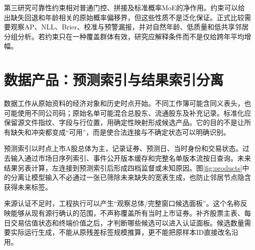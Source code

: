 第三研究可靠性约束相对普通门控、拼接及标准概率MoE的净作用。约束可以给出缺失回退和年龄相关的原始概率偏移界，但这些性质不是泛化保证。正式比较需要观察AP、NLL、Brier、校准与预警漏报，并对自然年龄、低质量和低共享邻居分组分析。若约束只在一种覆盖群体有效，研究应解释条件而不是仅给跨年平均增幅。


\section{数据产品：预测索引与结果索引分离}
数据工作从原始资料的经济对象和历史时点开始。不同工作簿可能含同义表头，也可能使用不同公司码；原始名单可能混合总股东、流通股东及补充记录。标准化应保留源文件指纹、字段与行位置，用确定性映射形成候选产品。它的目的不是让所有缺失和冲突都变成“可用”，而是使合法连接与不确定状态可以明确识别。

预测索引以时点上市A股总体为主，记录证券、预测日、当时身份和交易状态。过去输入通过市场日序列索引、事件公开版本缓存和完整名单版本流按日查询。未来结果另表计算，左连接到预测索引后形成四档监督或未知原因。图\ref{fig:products}中的分离让模型输入不必通过一张已筛除未来缺失的宽表生成，也防止邻居节点隐含获得未来标签。


来源认证不足时，工程执行可以产生“观察总体/完整窗口候选面板”。这个名称反映能够从现有源行确认的范围，不声称覆盖所有当时上市证券。补齐股票主表、每日交易估值状态和终端价值之后，才判断哪些候选可以进入认证面板。候选数量需要实际运行生成，不能从原残差标签规模推算，更不能把原样本ID直接改名沿用。

